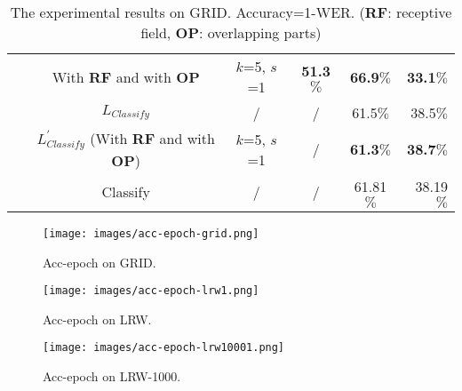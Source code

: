 \documentclass{bmvc2k}
\begin{document}
\begin{table}[H]
\begin{tabular}{p{1.39cm}|c|c|ccr}
			~&With \textbf{RF} and with \textbf{OP} &$k$=5, $s$=1& \textbf{51.3}$\%$ & \textbf{66.9}$\%$ &    \textbf{33.1}$\%$      \\
			~&$L_{Classify}$&  / &/& 61.5$\%$ & 38.5$\%$  \\
			~&$L_{Classify}^{'}$ (With \textbf{RF} and with \textbf{OP})&  $k$=5, $s$=1&/ & \textbf{61.3}$\%$ &\textbf{38.7}$\%$ \\
			~&Classify\cite{Yang2019}&/&/&61.81$\%$&38.19$\%$\\
			\hline
			\hline
		\end{tabular}
		\caption{The experimental results on GRID. Accuracy=1-WER. (\textbf{RF}: receptive field, \textbf{OP}: overlapping parts) 
			\vspace{-0.2cm}} \label{table1}
	\end{table}
	\vspace{-0.7cm}
	\begin{figure}[htbp]
		\setlength{\abovecaptionskip}{-0.0cm}   %
		\setlength{\belowcaptionskip}{-0.8cm} 
		\centering
		\begin{minipage}[t]{0.320\textwidth}
			
			\centering
			\texttt{[image: images/acc-epoch-grid.png]}
			\caption{Acc-epoch on GRID.} \label{figure5}
		\end{minipage}
		\begin{minipage}[t]{0.320\textwidth}
			\centering
			\texttt{[image: images/acc-epoch-lrw1.png]}
			\caption{Acc-epoch on LRW.} \label{figure6}
		\end{minipage}
		\begin{minipage}[t]{0.320\textwidth}
			\centering
			\texttt{[image: images/acc-epoch-lrw10001.png]}
			\caption{Acc-epoch on LRW-1000.} \label{figure7}
		\end{minipage}
	\end{figure}
\end{document}
